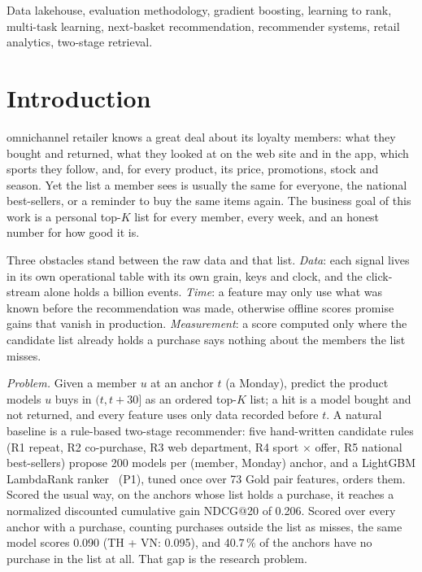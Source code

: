\documentclass{ieeeaccess}
\makeatletter
\newcommand{\nRefCond}{0.206}        %
\newcommand{\nRefUncond}{0.095}      %
\newcommand{\nNoPosShare}{40.7}      %
\makeatother
\begin{document}
\begin{keywords}
Data lakehouse, evaluation methodology, gradient boosting, learning to rank, multi-task learning, next-basket recommendation, recommender systems,
retail analytics, two-stage retrieval.
\end{keywords}

\titlepgskip=-15pt

\maketitle

\section{Introduction}
\label{sec:introduction}

 omnichannel retailer knows a great deal about its loyalty members: what they bought and returned, what they looked at
on the web site and in the app, which sports they follow, and, for every product, its price, promotions, stock and season. Yet the
list a member sees is usually the same for everyone, the national best-sellers, or a reminder to buy the same items again. The
business goal of this work is a personal top-$K$ list for every member, every week, and an honest number for how good it is.

Three obstacles stand between the raw data and that list. \emph{Data}: each signal lives in its own operational table with its own
grain, keys and clock, and the click-stream alone holds a billion events. \emph{Time}: a feature may only use what was known before
the recommendation was made, otherwise offline scores promise gains that vanish in production. \emph{Measurement}: a score computed
only where the candidate list already holds a purchase says nothing about the members the list misses.

\textit{Problem.} Given a member $u$ at an anchor $t$ (a Monday), predict the product models $u$ buys in $(t, t+30]$ as an ordered
top-$K$ list; a hit is a model bought and not returned, and every feature uses only data recorded before $t$. A natural baseline is a
rule-based two-stage recommender: five hand-written candidate rules (R1 repeat, R2 co-purchase, R3 web department, R4 sport $\times$
offer, R5 national best-sellers) propose 200 models per (member, Monday) anchor, and a LightGBM LambdaRank
ranker~\cite{ke2017lightgbm,burges2010lambdamart} (P1), tuned once over 73 Gold pair features, orders them. Scored the usual way, on
the anchors whose list holds a purchase, it reaches a normalized discounted cumulative gain NDCG@20 of \nRefCond{}. Scored over every
anchor with a purchase, counting purchases outside the list as misses, the same model scores 0.090 (TH + VN: \nRefUncond{}), and
\nNoPosShare{}\,\% of the anchors have no purchase in the list at all. That gap is the research problem.
\end{document}
